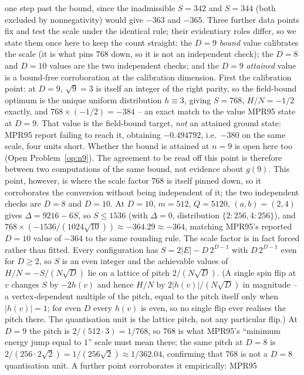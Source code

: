 \documentclass[12pt,a4paper]{article}
\theoremstyle{definition}
\begin{document}
one step past the bound, since the inadmissible $S=342$ and $S=344$
(both excluded by nonnegativity) would give $-363$ and $-365$. Three
further data points fix and test the scale under the identical rule; their
evidentiary roles differ, so we state them once here to keep the count
straight: the $D=9$ \emph{bound} value calibrates the scale (it is what pins
$768$ down, so it is not an independent check); the $D=8$ and $D=10$ values
are the two independent checks; and the $D=9$ \emph{attained} value is a
bound-free corroboration at the calibration dimension. First the calibration
point: at $D=9$, $\sqrt9=3$ is itself an integer of the right parity,
so the field-bound optimum is the unique uniform distribution $h\equiv3$,
giving $S=768$, $H/N=-1/2$ exactly, and $768\times(-1/2)=-384$ --
an exact match to the value MPR95 state at $D=9$. That value is the
field-bound target, \emph{not} an attained ground state: MPR95 report failing
to reach it, obtaining $-0.494792$, i.e.\ $-380$ on the same scale, four units
short. Whether the bound is attained at $n=9$ is open here too
(Open Problem~\ref{op:n9}). The agreement to be read off this point is
therefore between two computations of the same bound, not evidence about
$g(9)$. This point,
however, is where the scale factor $768$ is itself pinned down, so it
corroborates the conversion without being independent of it; the two
independent checks are $D=8$ and $D=10$. At $D=10$, $m=512$, $Q=5120$, $(a,b)=(2,4)$ gives
$\Delta=9216-6S$, so $S\le1536$ (with $\Delta=0$, distribution
$\{2{:}256,4{:}256\}$), and
$768\times(-1536/(1024\sqrt{10}))\approx-364.29\approx-364$, matching
MPR95's reported $D=10$ value of $-364$ to the same rounding rule. The scale factor is in fact forced rather than fitted. Every configuration
has $S=2|E|-D\,2^{D-1}$ with $D\,2^{D-1}$ even for $D\ge2$, so $S$ is an even
integer and the achievable values of $H/N=-S/(N\sqrt D)$ lie on a lattice of
pitch $2/(N\sqrt D)$. (A single spin flip at $v$ changes $S$ by $-2h(v)$ and
hence $H/N$ by $2|h(v)|/(N\sqrt D)$ in magnitude -- a vertex-dependent
multiple of the pitch, equal to the pitch itself only when $|h(v)|=1$; for
even $D$ every $h(v)$ is even, so no single flip ever realises the pitch
there. The quantisation unit is the lattice pitch, not any particular flip.)
At $D=9$ the pitch is $2/(512\cdot3)=1/768$, so $768$ is what MPR95's
``minimum energy jump equal to $1$'' scale must mean there; the same pitch at
$D=8$ is $2/(256\cdot2\sqrt2)=1/(256\sqrt2)\approx1/362.04$, confirming that
$768$ is not a $D=8$ quantisation unit. A further point
corroborates it empirically: MPR95
\end{document}
